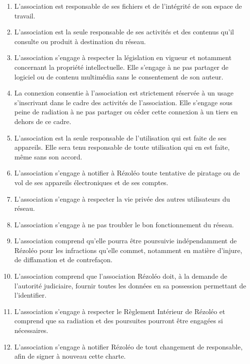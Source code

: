 \documentclass[11pt, a4paper]{article}
\begin{document}
\begin{enumerate}

\item L'association est responsable de ses fichiers et de l'intégrité de son espace de travail.

\item L'association est la seule responsable de ses activités et des contenus qu'il consulte ou produit à destination du réseau.

\item L'association s'engage à respecter la législation en vigueur et notamment concernant la propriété intellectuelle. Elle s'engage à ne pas partager de logiciel ou de contenu multimédia sans le consentement de son auteur.

\item La connexion consentie à l'association est strictement réservée à un usage s'inscrivant dans le cadre des activités de l'association. Elle s'engage sous peine de radiation à ne pas partager ou céder cette connexion à un tiers en dehors de ce cadre.

\item L'association est la seule responsable de l'utilisation qui est faite de ses appareils. Elle sera tenu responsable de toute utilisation qui en est faite, même sans son accord.

\item L'association s'engage à notifier à Rézoléo toute tentative de piratage ou de vol de ses appareils électroniques et de ses comptes.

\item L'association s'engage à respecter la vie privée des autres utilisateurs du réseau.

\item L'association s'engage à ne pas troubler le bon fonctionnement du réseau.

\item L'association comprend qu'elle pourra être poursuivie indépendamment de Rézoléo pour les infractions qu'elle commet, notamment en matière d'injure, de diffamation et de contrefaçon.

\item L'association comprend que l'association Rézoléo doit, à la demande de l'autorité judiciaire, fournir toutes les données en sa possession permettant de l'identifier.

\item L'association s'engage à respecter le Règlement Intérieur de Rézoléo  et comprend que sa radiation et des poursuites pourront être engagées si nécessaires.

\item L'association s'engage à notifier Rézoléo de tout changement de responsable, afin de signer à nouveau cette charte.

\end{enumerate}
\end{document}
